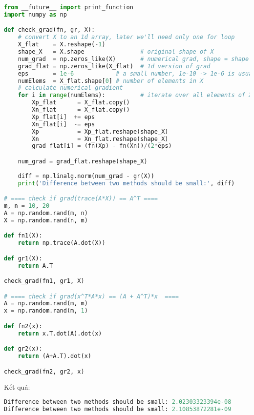     


\begin{lstlisting}[language=Python]
from __future__ import print_function 
import numpy as np 

def check_grad(fn, gr, X):
    # convert X to an 1d array, later we'll need only one for loop
    X_flat    = X.reshape(-1)
    shape_X   = X.shape                # original shape of X 
    num_grad  = np.zeros_like(X)       # numerical grad, shape = shape of X 
    grad_flat = np.zeros_like(X_flat)  # 1d version of grad
    eps       = 1e-6            # a small number, 1e-10 -> 1e-6 is usually good
    numElems  = X_flat.shape[0] # number of elements in X 
    # calculate numerical gradient 
    for i in range(numElems):          # iterate over all elements of X 
        Xp_flat      = X_flat.copy()
        Xn_flat      = X_flat.copy()
        Xp_flat[i]  += eps
        Xn_flat[i]  -= eps
        Xp           = Xp_flat.reshape(shape_X) 
        Xn           = Xn_flat.reshape(shape_X)
        grad_flat[i] = (fn(Xp) - fn(Xn))/(2*eps)

    num_grad = grad_flat.reshape(shape_X) 
    
    diff = np.linalg.norm(num_grad - gr(X))
    print('Difference between two methods should be small:', diff)

# ==== check if grad(trace(A*X)) == A^T ====
m, n = 10, 20
A = np.random.rand(m, n)
X = np.random.rand(n, m)

def fn1(X):
    return np.trace(A.dot(X))

def gr1(X):
    return A.T 

check_grad(fn1, gr1, X)

# ==== check if grad(x^T*A*x) == (A + A^T)*x  ====
A = np.random.rand(m, m)
x = np.random.rand(m, 1)

def fn2(x):
    return x.T.dot(A).dot(x) 

def gr2(x): 
    return (A+A.T).dot(x)

check_grad(fn2, gr2, x)

\end{lstlisting}

Kết quả:
\begin{lstlisting}[language=Python]
Difference between two methods should be small: 2.02303323394e-08
Difference between two methods should be small: 2.10853872281e-09
\end{lstlisting}
 
